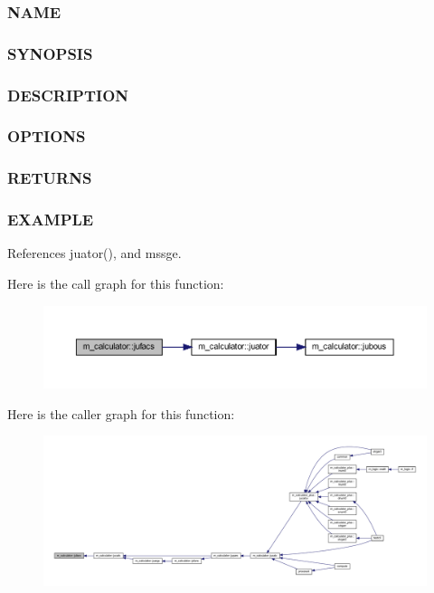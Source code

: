 \subsubsection*{N\+A\+ME}

\subsubsection*{S\+Y\+N\+O\+P\+S\+IS}

\subsubsection*{D\+E\+S\+C\+R\+I\+P\+T\+I\+ON}

\subsubsection*{O\+P\+T\+I\+O\+NS}

\subsubsection*{R\+E\+T\+U\+R\+NS}

\subsubsection*{E\+X\+A\+M\+P\+LE}

References juator(), and mssge.

Here is the call graph for this function\+:
\nopagebreak
\begin{figure}[H]
\begin{center}
\leavevmode
\includegraphics[width=350pt]{namespacem__calculator_a78c73098f0fcf1130ea9f5f3748bef7d_cgraph}
\end{center}
\end{figure}
Here is the caller graph for this function\+:
\nopagebreak
\begin{figure}[H]
\begin{center}
\leavevmode
\includegraphics[width=350pt]{namespacem__calculator_a78c73098f0fcf1130ea9f5f3748bef7d_icgraph}
\end{center}
\end{figure}
\mbox{\label{namespacem__calculator_ab9afbbbd87dd1434f72853350afec2a6}} 
